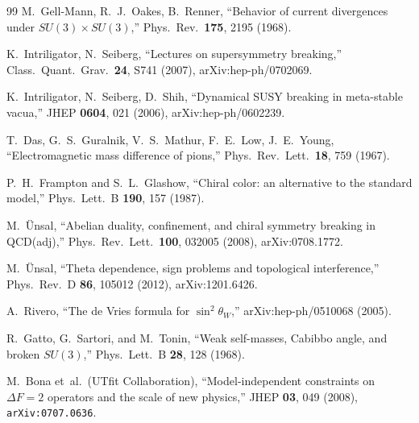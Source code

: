 \documentclass[12pt,a4paper]{article}
\begin{document}
\begin{thebibliography}{99}
M.~Gell-Mann, R.~J.~Oakes, B.~Renner, ``Behavior of current 
divergences under $SU(3) \times SU(3)$,'' 
Phys.\ Rev.\ \textbf{175}, 2195 (1968).

K.~Intriligator, N.~Seiberg, ``Lectures on supersymmetry breaking,''
Class.\ Quant.\ Grav.\ \textbf{24}, S741 (2007), arXiv:hep-ph/0702069.

K.~Intriligator, N.~Seiberg, D.~Shih, ``Dynamical SUSY breaking 
in meta-stable vacua,'' JHEP \textbf{0604}, 021 (2006),
arXiv:hep-ph/0602239.

T.~Das, G.~S.~Guralnik, V.~S.~Mathur, F.~E.~Low, J.~E.~Young,
``Electromagnetic mass difference of pions,''
Phys.\ Rev.\ Lett.\ \textbf{18}, 759 (1967).

P.~H.~Frampton and S.~L.~Glashow, ``Chiral color: an alternative
to the standard model,'' Phys.\ Lett.\ B \textbf{190}, 157 (1987).

M.~\"Unsal, ``Abelian duality, confinement, and chiral symmetry
breaking in QCD(adj),'' Phys.\ Rev.\ Lett.\ \textbf{100}, 032005
(2008), arXiv:0708.1772.

M.~\"Unsal, ``Theta dependence, sign problems and topological
interference,'' Phys.\ Rev.\ D \textbf{86}, 105012 (2012),
arXiv:1201.6426.

A.~Rivero, ``The de Vries formula for $\sin^2\theta_W$,''
arXiv:hep-ph/0510068 (2005).

R.~Gatto, G.~Sartori, and M.~Tonin, ``Weak self-masses, Cabibbo
angle, and broken $SU(3)$,'' Phys.\ Lett.\ B \textbf{28}, 128 (1968).

M.~Bona et~al.\ (UTfit Collaboration), ``Model-independent
constraints on $\Delta F = 2$ operators and the scale of new
physics,'' JHEP \textbf{03}, 049 (2008),
\texttt{arXiv:0707.0636}.

\end{thebibliography}
\end{document}
